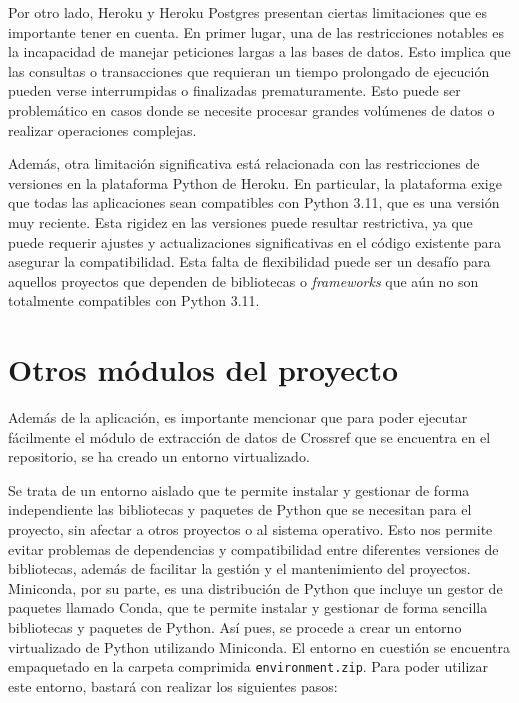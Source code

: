 Por otro lado, Heroku y Heroku Postgres presentan ciertas limitaciones que es importante tener en cuenta. En primer lugar, una de las restricciones notables es la incapacidad de manejar peticiones largas a las bases de datos. Esto implica que las consultas o transacciones que requieran un tiempo prolongado de ejecución pueden verse interrumpidas o finalizadas prematuramente. Esto puede ser problemático en casos donde se necesite procesar grandes volúmenes de datos o realizar operaciones complejas.

Además, otra limitación significativa está relacionada con las restricciones de versiones en la plataforma Python de Heroku. En particular, la plataforma exige que todas las aplicaciones sean compatibles con Python 3.11, que es una versión muy reciente. Esta rigidez en las versiones puede resultar restrictiva, ya que puede requerir ajustes y actualizaciones significativas en el código existente para asegurar la compatibilidad. Esta falta de flexibilidad puede ser un desafío para aquellos proyectos que dependen de bibliotecas o \textit{frameworks} que aún no son totalmente compatibles con Python 3.11.

\section{Otros módulos del proyecto}
Además de la aplicación, es importante mencionar que para poder ejecutar fácilmente el módulo de extracción de datos de Crossref que se encuentra en el repositorio, se ha creado un entorno virtualizado.

Se trata de un entorno aislado que te permite instalar y gestionar de forma independiente las bibliotecas y paquetes de Python que se necesitan para el proyecto, sin afectar a otros proyectos o al sistema operativo. Esto nos permite evitar  problemas de dependencias y compatibilidad entre diferentes versiones de bibliotecas, además de facilitar la gestión y el mantenimiento del proyectos. Miniconda, por su parte, es una distribución de Python que incluye un gestor de paquetes llamado Conda, que te permite instalar y gestionar de forma sencilla bibliotecas y paquetes de Python. Así pues, se procede a crear un entorno virtualizado de Python utilizando Miniconda. El entorno en cuestión se encuentra empaquetado en la carpeta comprimida \texttt{environment.zip}. Para poder utilizar este entorno, bastará con realizar los siguientes pasos:

